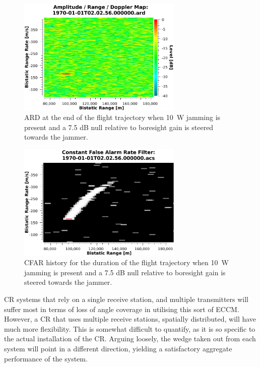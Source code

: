 \documentclass[english, 12pt]{report}
\begin{document}
\begin{figure}[htbp]
\begin{center}
\includegraphics[width=0.7\textwidth]{figs/Simulations/10WJammingNullSteeringARDLast.pdf}
\caption[10~W jammer with null steered.]{ARD at the end of the flight trajectory when 10~W jamming is present and a 7.5 dB null relative to boresight gain is steered towards the jammer.}
\label{fig:10WJammingNullSteeringARDLast}
\end{center}
\end{figure}

\begin{figure}[htbp]
\begin{center}
\includegraphics[width=0.7\textwidth]{figs/Simulations/10WJammingNullSteeringCFAR.pdf}
\caption[CFAR history with null steered to jammer of 10~W.]{CFAR history for the duration of the flight trajectory when 10~W jamming is present and a 7.5 dB null relative to boresight gain is steered towards the jammer.}
\label{fig:10WJammingNullSteeringCFAR}
\end{center}
\end{figure}

\clearpage

CR systems that rely on a single receive station, and multiple transmitters will suffer most in terms of loss of angle coverage in utilising this sort of ECCM. However, a CR that uses multiple receive stations, spatially distributed, will have much more flexibility.  This is somewhat difficult to quantify, as it is so specific to the actual installation of the CR. Arguing loosely, the wedge taken out from each system will point in a different direction, yielding a satisfactory aggregate performance of the system. 
\end{document}
